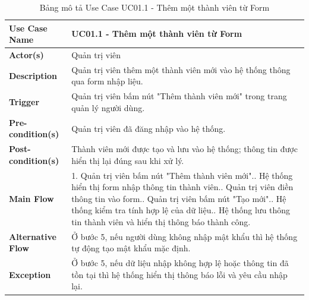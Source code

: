 \begin{table}[H]
	\centering
	\renewcommand{\arraystretch}{1.25}
	\begin{tabular}{|p{3.8cm}|p{11.2cm}|}
		\hline
		\textbf{Use Case Name} & \textbf{UC01.1 - Thêm một thành viên từ Form} \\ \hline
		\textbf{Actor(s)} & Quản trị viên \\ \hline
		\textbf{Description} & Quản trị viên thêm một thành viên mới vào hệ thống thông qua form nhập liệu. \\ \hline
		\textbf{Trigger} & Quản trị viên bấm nút "Thêm thành viên mới" trong trang quản lý người dùng. \\ \hline
		\textbf{Pre-condition(s)} & Quản trị viên đã đăng nhập vào hệ thống. \\ \hline
		\textbf{Post-condition(s)} & Thành viên mới được tạo và lưu vào hệ thống; thông tin được hiển thị lại đúng sau khi xử lý. \\ \hline
		\textbf{Main Flow} & 1. Quản trị viên bấm nút "Thêm thành viên mới".\newline
		2. Hệ thống hiển thị form nhập thông tin thành viên.\newline
		3. Quản trị viên điền thông tin vào form.\newline
		4. Quản trị viên bấm nút "Tạo mới".\newline
		5. Hệ thống kiểm tra tính hợp lệ của dữ liệu.\newline
		6. Hệ thống lưu thông tin thành viên và hiển thị thông báo thành công. \\ \hline
		\textbf{Alternative Flow} & Ở bước 5, nếu người dùng không nhập mật khẩu thì hệ thống tự động tạo mật khẩu mặc định. \\ \hline
		\textbf{Exception} & Ở bước 5, nếu dữ liệu nhập không hợp lệ hoặc thông tin đã tồn tại thì hệ thống hiển thị thông báo lỗi và yêu cầu nhập lại. \\ \hline
	\end{tabular}
	\caption{Bảng mô tả Use Case UC01.1 - Thêm một thành viên từ Form}
\end{table}

